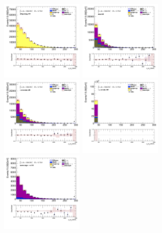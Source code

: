 		\begin{figure}[!htp]
			\begin{center}    
			\includegraphics[width=0.35\textwidth]{chapters/chapter6_HPlus/images/taulep/el_0_pt_DILEP_BTAG.png}
			\includegraphics[width=0.35\textwidth]{chapters/chapter6_HPlus/images/taulep/el_0_pt_ZEE.png} \\
			\includegraphics[width=0.35\textwidth]{chapters/chapter6_HPlus/images/taulep/el_0_pt_TAUEL_BVETO.png} 
			\includegraphics[width=0.35\textwidth]{chapters/chapter6_HPlus/images/taulep/el_0_pt_TAUMU_BVETO.png} \\
			\includegraphics[width=0.35\textwidth]{chapters/chapter6_HPlus/images/taulep/el_0_pt_SS_TAUEL.png} 

\end{center}
\end{figure}
